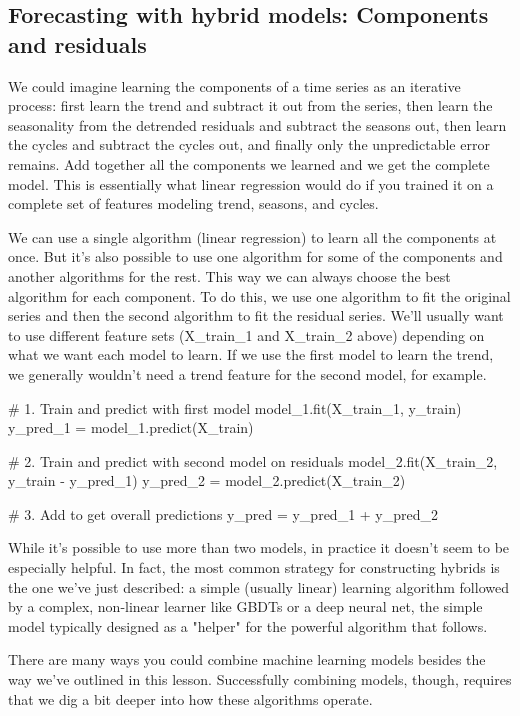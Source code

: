 \documentclass[12pt]{report}
\begin{document}
\subsection{Forecasting with hybrid models: Components and residuals}

We could imagine learning the components of a time series as an iterative process: first learn the trend and subtract it out from the series, then learn the seasonality from the detrended residuals and subtract the seasons out, then learn the cycles and subtract the cycles out, and finally only the unpredictable error remains. Add together all the components we learned and we get the complete model. This is essentially what linear regression would do if you trained it on a complete set of features modeling trend, seasons, and cycles.


We can use a single algorithm (linear regression) to learn all the components at once. But it's also possible to use one algorithm for some of the components and another algorithms for the rest. This way we can always choose the best algorithm for each component. To do this, we use one algorithm to fit the original series and then the second algorithm to fit the residual series. We'll usually want to use different feature sets (X\_train\_1 and X\_train\_2 above) depending on what we want each model to learn. If we use the first model to learn the trend, we generally wouldn't need a trend feature for the second model, for example.

\# 1. Train and predict with first model
model\_1.fit(X\_train\_1, y\_train)
y\_pred\_1 = model\_1.predict(X\_train)

\# 2. Train and predict with second model on residuals
model\_2.fit(X\_train\_2, y\_train - y\_pred\_1)
y\_pred\_2 = model\_2.predict(X\_train\_2)

\# 3. Add to get overall predictions
y\_pred = y\_pred\_1 + y\_pred\_2

While it's possible to use more than two models, in practice it doesn't seem to be especially helpful. In fact, the most common strategy for constructing hybrids is the one we've just described: a simple (usually linear) learning algorithm followed by a complex, non-linear learner like GBDTs or a deep neural net, the simple model typically designed as a "helper" for the powerful algorithm that follows.


There are many ways you could combine machine learning models besides the way we've outlined in this lesson. Successfully combining models, though, requires that we dig a bit deeper into how these algorithms operate.
\end{document}
